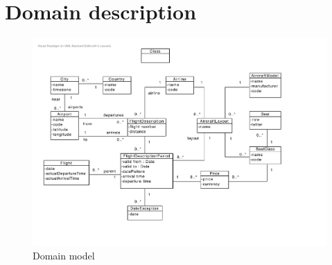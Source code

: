 \documentclass[a4paper,11pt]{article}
\begin{document}
\tableofcontents

\clearpage

\section{Domain description}

\begin{figure}[H]
    \includegraphics[width=\textwidth]{domain-model.pdf}
    \caption{Domain model}
    \label{fig:domain-model}
\end{figure}
\end{document}
